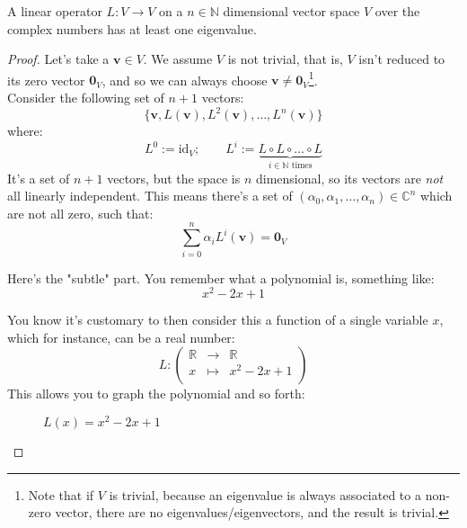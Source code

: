 \documentclass[solutions.tex]{subfiles}
\renewcommand{\bm}[1]{\pmb{#1}}
\begin{document}
\begin{lemma} A linear operator $L : V \rightarrow V$
on a $n\in\mathbb{N}$ dimensional vector space $V$
over the complex numbers has at least one eigenvalue.
\end{lemma}
\begin{proof}
Let's take a $\bm{v}\in V$. We assume $V$ is not trivial, that
is, $V$ isn't reduced to its zero vector $\bm{0}_V$, and so
we can always choose $\bm{v} \neq \bm{0}_V$\footnote{Note that
if $V$ is trivial, because an eigenvalue is always associated
to a non-zero vector, there are no eigenvalues/eigenvectors, and
the result is trivial.}. \\

Consider the following set of $n+1$ vectors:
\[
	\{ \bm{v}, L(\bm{v}), L^2(\bm{v}), \ldots, L^n(\bm{v}) \}
\]
where:
\[
	L^0 := \text{id}_V;\qquad L^i := \underbrace{
		L\circ L\circ\ldots\circ L
	}_{i\in\mathbb{N}\text{ times}}
\]
It's a set of $n+1$ vectors, but the space is $n$ dimensional, so
its vectors are \textit{not} all linearly independent. This
means there's a set of $(\alpha_0, \alpha_1, \ldots, \alpha_n)\in\mathbb{C}^n$
which are not all zero, such that:
\begin{equation}
	\sum_{i=0}^n \alpha_iL^i(\bm{v}) = \bm{0}_V \label{qm:L03E01:not-linindep}
\end{equation}

Here's the "subtle" part. You remember what a polynomial is,
something like: \[ x^2 - 2x + 1 \]

You know it's customary to then consider this a function of
a single variable $x$, which for instance, can be a real number:
\[
	L : \begin{pmatrix}
		\mathbb{R} & \rightarrow & \mathbb{R} \\
		x & \mapsto & x^2 - 2x + 1 \\
	\end{pmatrix}
\]
This allows you to graph the polynomial and so forth:

\begin{figure}[H]
	\centering
	\caption{$L(x) = x^2 - 2x + 1$}
\end{figure}


\end{proof}
\end{document}

